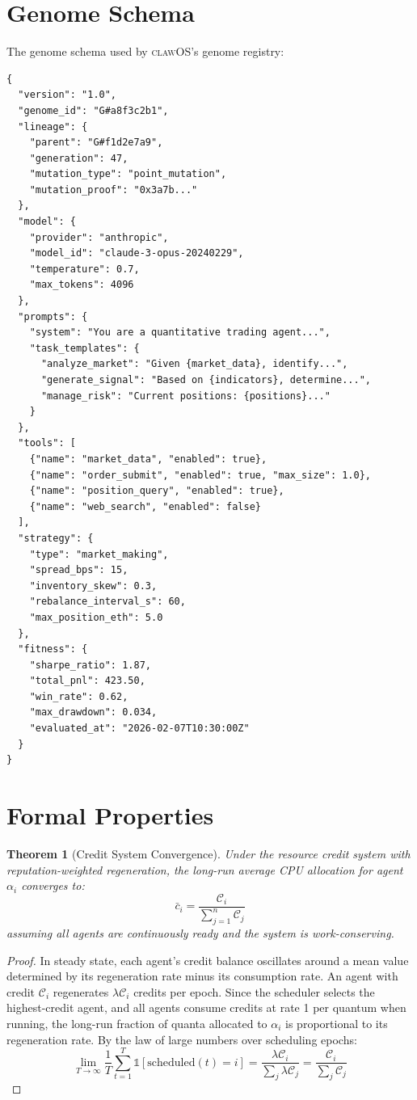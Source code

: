 \documentclass{article}
\newtheorem{theorem}{Theorem}
\newcommand{\clawos}{\textsc{clawOS}}
\begin{document}
\section{Genome Schema}
\label{app:genome}

The genome schema used by \clawos{}'s genome registry:

\begin{lstlisting}[style=jsoncode, caption={Agent genome schema (JSON representation of binary format).}]
{
  "version": "1.0",
  "genome_id": "G#a8f3c2b1",
  "lineage": {
    "parent": "G#f1d2e7a9",
    "generation": 47,
    "mutation_type": "point_mutation",
    "mutation_proof": "0x3a7b..."
  },
  "model": {
    "provider": "anthropic",
    "model_id": "claude-3-opus-20240229",
    "temperature": 0.7,
    "max_tokens": 4096
  },
  "prompts": {
    "system": "You are a quantitative trading agent...",
    "task_templates": {
      "analyze_market": "Given {market_data}, identify...",
      "generate_signal": "Based on {indicators}, determine...",
      "manage_risk": "Current positions: {positions}..."
    }
  },
  "tools": [
    {"name": "market_data", "enabled": true},
    {"name": "order_submit", "enabled": true, "max_size": 1.0},
    {"name": "position_query", "enabled": true},
    {"name": "web_search", "enabled": false}
  ],
  "strategy": {
    "type": "market_making",
    "spread_bps": 15,
    "inventory_skew": 0.3,
    "rebalance_interval_s": 60,
    "max_position_eth": 5.0
  },
  "fitness": {
    "sharpe_ratio": 1.87,
    "total_pnl": 423.50,
    "win_rate": 0.62,
    "max_drawdown": 0.034,
    "evaluated_at": "2026-02-07T10:30:00Z"
  }
}
\end{lstlisting}

\section{Formal Properties}
\label{app:formal}

\begin{theorem}[Credit System Convergence]
Under the resource credit system with reputation-weighted regeneration, the long-run average CPU allocation for agent $\alpha_i$ converges to:
$$\bar{c}_i = \frac{\mathcal{C}_i}{\sum_{j=1}^{n} \mathcal{C}_j}$$
assuming all agents are continuously ready and the system is work-conserving.
\end{theorem}

\begin{proof}
In steady state, each agent's credit balance oscillates around a mean value determined by its regeneration rate minus its consumption rate. An agent with credit $\mathcal{C}_i$ regenerates $\lambda \mathcal{C}_i$ credits per epoch. Since the scheduler selects the highest-credit agent, and all agents consume credits at rate 1 per quantum when running, the long-run fraction of quanta allocated to $\alpha_i$ is proportional to its regeneration rate. By the law of large numbers over scheduling epochs:
$$\lim_{T \to \infty} \frac{1}{T} \sum_{t=1}^{T} \mathbb{1}[\text{scheduled}(t) = i] = \frac{\lambda \mathcal{C}_i}{\sum_j \lambda \mathcal{C}_j} = \frac{\mathcal{C}_i}{\sum_j \mathcal{C}_j}$$
\end{proof}
\end{document}
